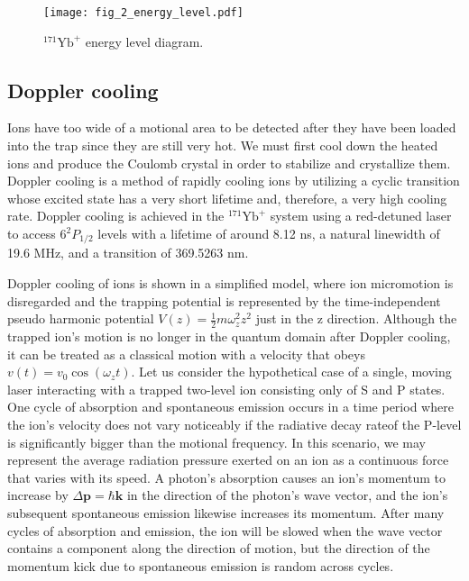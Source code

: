 \begin{figure}
    \centering
    \texttt{[image: fig\_2\_energy\_level.pdf]}
    \caption{${ }^{171} \mathrm{Yb}^{+}$ energy level diagram.}
    \label{fig:energy_level}
\end{figure}

\subsection{Doppler cooling}

Ions have too wide of a motional area to be detected after they have been loaded into the trap since they are still very hot. We must first cool down the heated ions and produce the Coulomb crystal in order to stabilize and crystallize them. Doppler cooling is a method of rapidly cooling ions by utilizing a cyclic transition whose excited state has a very short lifetime and, therefore, a very high cooling rate. Doppler cooling is achieved in the ${ }^{171} \mathrm{Yb}^{+}$ system using a red-detuned laser to access $6^2 P_{1 / 2}$ levels with a lifetime of around 8.12 ns, a natural linewidth of 19.6 MHz, and a transition of 369.5263 nm.

Doppler cooling of ions is shown in a simplified model, where ion micromotion is disregarded and the trapping potential is represented by the time-independent pseudo harmonic potential $V(z)=\frac{1}{2} m \omega_z^2 z^2$ just in the z direction. Although the trapped ion's motion is no longer in the quantum domain after Doppler cooling, it can be treated as a classical motion with a velocity that obeys $v(t)=v_0 \cos \left(\omega_z t\right)$. Let us consider the hypothetical case of a single, moving laser interacting with a trapped two-level ion consisting only of S and P states. One cycle of absorption and spontaneous emission occurs in a time period where the ion's velocity does not vary noticeably if the radiative decay rateof the P-level is significantly bigger than the motional frequency. In this scenario, we may represent the average radiation pressure exerted on an ion as a continuous force that varies with its speed. A photon's absorption causes an ion's momentum to increase by $\Delta \mathbf{p}=\hbar \mathbf{k}$ in the direction of the photon's wave vector, and the ion's subsequent spontaneous emission likewise increases its momentum. After many cycles of absorption and emission, the ion will be slowed when the wave vector contains a component along the direction of motion, but the direction of the momentum kick due to spontaneous emission is random across cycles.

